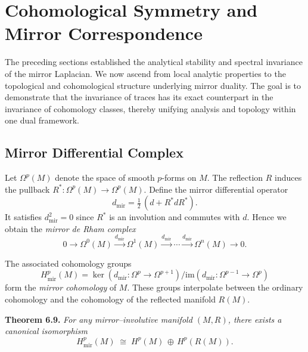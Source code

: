 \section{Cohomological Symmetry and Mirror Correspondence}\relax \hspace{0pt}

The preceding sections established the analytical stability
and spectral invariance of the mirror Laplacian.
We now ascend from local analytic properties
to the topological and cohomological structure
underlying mirror duality.
The goal is to demonstrate that the invariance of traces
has its exact counterpart in the invariance of cohomology classes,
thereby unifying analysis and topology within one dual framework.

\subsection{Mirror Differential Complex}\relax \hspace{0pt}

Let \(\Omega^{p}(M)\) denote the space of smooth \(p\)-forms on \(M\).
The reflection \(R\) induces the pullback
\(R^{*}:\Omega^{p}(M)\to\Omega^{p}(M)\).
Define the mirror differential operator
\begin{equation}
d_{\mathrm{mir}}
=\tfrac{1}{2}\,(d+R^{*}dR^{*}).
\end{equation}
It satisfies \(d_{\mathrm{mir}}^{2}=0\)
since \(R^{*}\) is an involution and commutes with \(d\).
Hence we obtain the \emph{mirror de Rham complex}
\[
0 \longrightarrow \Omega^{0}(M)
\xrightarrow{d_{\mathrm{mir}}}
\Omega^{1}(M)
\xrightarrow{d_{\mathrm{mir}}}
\cdots
\xrightarrow{d_{\mathrm{mir}}}
\Omega^{n}(M)
\longrightarrow 0.
\]

The associated cohomology groups
\begin{equation}
H^{p}_{\mathrm{mir}}(M)
=\ker(d_{\mathrm{mir}}:\Omega^{p}\to\Omega^{p+1})/
\mathrm{im}(d_{\mathrm{mir}}:\Omega^{p-1}\to\Omega^{p})
\end{equation}
form the \emph{mirror cohomology} of \(M\).
These groups interpolate between the ordinary cohomology
and the cohomology of the reflected manifold \(R(M)\).

\noindent
\textbf{Theorem 6.9.}
\emph{For any mirror–involutive manifold \((M,R)\),
there exists a canonical isomorphism}
\[
H^{p}_{\mathrm{mir}}(M)
\;\cong\;
H^{p}(M)\,\oplus\,H^{p}(R(M)).
\]

